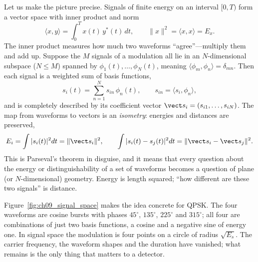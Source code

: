 Let us make the picture precise. Signals of finite energy on an interval $[0,T)$ form a vector
space with inner product and norm
\begin{equation}
\langle x,y\rangle=\int_0^T x(t)\,y^*(t)\,dt,\qquad \|x\|^2=\langle x,x\rangle=E_x .
\label{eq:ch09:inner}
\end{equation}
The inner product measures how much two waveforms ``agree''---multiply them and add up. Suppose
the $M$ signals of a modulation all lie in an $N$-dimensional subspace ($N\le M$) spanned by
 $\phi_1(t),\dots,\phi_N(t)$, meaning
$\langle\phi_m,\phi_n\rangle=\delta_{mn}$. Then each signal is a weighted sum of basis functions,
\begin{equation}
s_i(t)=\sum_{n=1}^{N}s_{in}\,\phi_n(t),\qquad s_{in}=\langle s_i,\phi_n\rangle,
\label{eq:ch09:expansion}
\end{equation}
and is completely described by its coefficient vector $\vect s_i=(s_{i1},\dots,s_{iN})$. The map
from waveforms to vectors is an \emph{isometry}: energies and distances are preserved,
\begin{equation}
E_i=\int|s_i(t)|^2dt=\|\vect s_i\|^2,\qquad
\int|s_i(t)-s_j(t)|^2dt=\|\vect s_i-\vect s_j\|^2 .
\label{eq:ch09:isometry}
\end{equation}
This is Parseval's theorem in disguise, and it means that every question about the energy or
distinguishability of a set of waveforms becomes a question of plane (or $N$-dimensional)
geometry. Energy is length squared; ``how different are these two signals'' is distance.

Figure~\ref{fig:ch09_signal_space} makes the idea concrete for QPSK. The four waveforms are
cosine bursts with phases $45^\circ$, $135^\circ$, $225^\circ$ and $315^\circ$; all four are
combinations of just two basis functions, a cosine and a negative sine of energy one. In signal
space the modulation is four points on a circle of radius $\sqrt{E_s}$. The carrier frequency,
the waveform shapes and the duration have vanished; what remains is the only thing that matters
to a detector.


